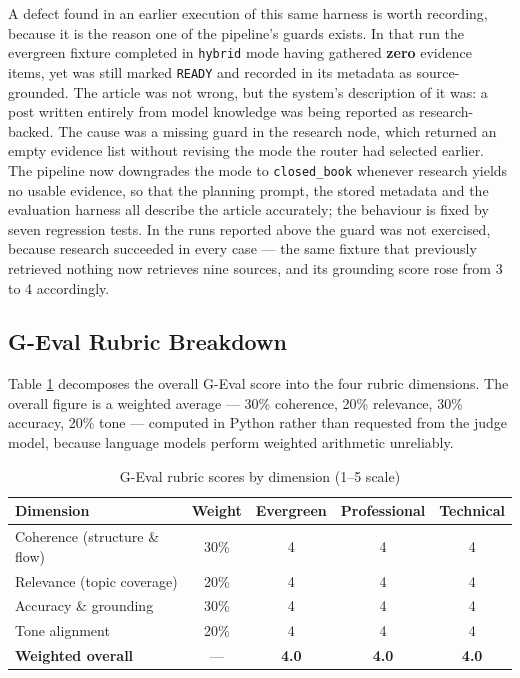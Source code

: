 A defect found in an earlier execution of this same harness is worth recording,
because it is the reason one of the pipeline's guards exists. In that run the
evergreen fixture completed in \texttt{hybrid} mode having gathered
\textbf{zero} evidence items, yet was still marked \texttt{READY} and recorded
in its metadata as source-grounded. The article was not wrong, but the system's
description of it was: a post written entirely from model knowledge was being
reported as research-backed. The cause was a missing guard in the research
node, which returned an empty evidence list without revising the mode the
router had selected earlier. The pipeline now downgrades the mode to
\texttt{closed\_book} whenever research yields no usable evidence, so that the
planning prompt, the stored metadata and the evaluation harness all describe
the article accurately; the behaviour is fixed by seven regression tests. In
the runs reported above the guard was not exercised, because research succeeded
in every case --- the same fixture that previously retrieved nothing now
retrieves nine sources, and its grounding score rose from 3 to 4 accordingly.

\subsection{G-Eval Rubric Breakdown}

Table \ref{tab:geval_breakdown} decomposes the overall G-Eval score into the
four rubric dimensions. The overall figure is a weighted average --- 30\%
coherence, 20\% relevance, 30\% accuracy, 20\% tone --- computed in Python
rather than requested from the judge model, because language models perform
weighted arithmetic unreliably.

\begin{table}[ht]
    \centering
    \renewcommand{\arraystretch}{1.3}
    \begin{tabular}{|l|c|c|c|c|}
        \hline
        \textbf{Dimension} & \textbf{Weight} & \textbf{Evergreen} &
        \textbf{Professional} & \textbf{Technical} \\
        \hline
        Coherence (structure \& flow) & 30\% & 4 & 4 & 4 \\
        \hline
        Relevance (topic coverage) & 20\% & 4 & 4 & 4 \\
        \hline
        Accuracy \& grounding & 30\% & 4 & 4 & 4 \\
        \hline
        Tone alignment & 20\% & 4 & 4 & 4 \\
        \hline
        \textbf{Weighted overall} & --- & \textbf{4.0} & \textbf{4.0} & \textbf{4.0} \\
        \hline
    \end{tabular}
    \caption{G-Eval rubric scores by dimension (1--5 scale)}
    \label{tab:geval_breakdown}
\end{table}

